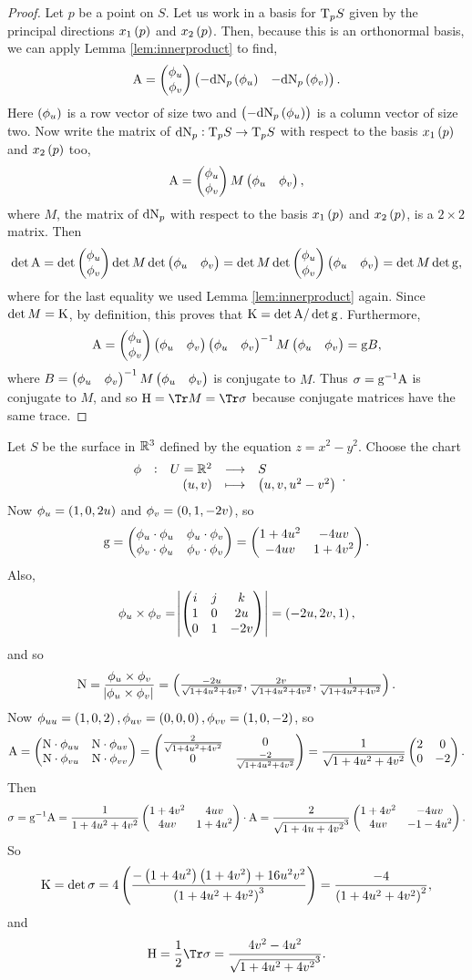 \begin{proof}
Let $ p $ be a point on $ S $. Let us work in a basis for $ \mathrm{T}_p S $ given by the principal directions $ x_1\br{p} $ and $ x_2\br{p} $. Then, because this is an orthonormal basis, we can apply Lemma \ref{lem:innerproduct} to find,
$$ \A = \twobyone{\phi_u}{\phi_v}\onebytwo{-\d\N_p\br{\phi_u}}{-\d\N_p\br{\phi_v}}. $$
Here $ \br{\phi_u} $ is a row vector of size two and $ \br{-\d\N_p\br{\phi_u}} $ is a column vector of size two. Now write the matrix of $ \mathrm{d}\mathrm{N}_p : \mathrm{T}_p S \to \mathrm{T}_p S $ with respect to the basis $ x_1\br{p} $ and $ x_2\br{p} $ too,
$$ \mathrm{A} = \begin{pmatrix} \phi_u \\ \phi_v \end{pmatrix}M\begin{pmatrix} \phi_u & \phi_v \end{pmatrix}, $$
where $ M $, the matrix of $ \mathrm{d}\mathrm{N}_p $ with respect to the basis $ x_1\br{p} $ and $ x_2\br{p} $, is a $ 2 \times 2 $ matrix. Then
$$ \det \mathrm{A} = \det \begin{pmatrix} \phi_u \\ \phi_v \end{pmatrix}\det M\det \begin{pmatrix} \phi_u & \phi_v \end{pmatrix} = \det M\det \begin{pmatrix} \phi_u \\ \phi_v \end{pmatrix}\begin{pmatrix} \phi_u & \phi_v \end{pmatrix} = \det M\det \mathrm{g}, $$
where for the last equality we used Lemma \ref{lem:innerproduct} again. Since $ \det M = \mathrm{K} $, by definition, this proves that $ \mathrm{K} = \det \mathrm{A} / \det \mathrm{g} $. Furthermore,
$$ \mathrm{A} = \begin{pmatrix} \phi_u \\ \phi_v \end{pmatrix}\begin{pmatrix} \phi_u & \phi_v \end{pmatrix}\begin{pmatrix} \phi_u & \phi_v \end{pmatrix}^{-1}M\begin{pmatrix} \phi_u & \phi_v \end{pmatrix} = \mathrm{g} B, $$
where $ B = \begin{pmatrix} \phi_u & \phi_v \end{pmatrix}^{-1}M\begin{pmatrix} \phi_u & \phi_v \end{pmatrix} $ is conjugate to $ M $. Thus $ \sigma = \mathrm{g}^{-1}\mathrm{A} $ is conjugate to $ M $, and so $ \H = \Tr M = \Tr \sigma $ because conjugate matrices have the same trace.
\end{proof}


\begin{example*}
Let $ S $ be the surface in $ \mathbb{R}^3 $ defined by the equation $ z = x^2 - y^2 $. Choose the chart
$$ \function[\phi]{U = \RR^2}{S}{\br{u, v}}{\br{u, v, u^2 - v^2}}. $$
Now $ \phi_u = \br{1, 0, 2u} $ and $ \phi_v = \br{0, 1, -2v} $, so
$$ \mathrm{g} = \begin{pmatrix} \phi_u \cdot \phi_u & \phi_u \cdot \phi_v \\ \phi_v \cdot \phi_u & \phi_v \cdot \phi_v \end{pmatrix} = \begin{pmatrix} 1 + 4u^2 & -4uv \\ -4uv & 1 + 4v^2 \end{pmatrix}. $$
Also,
$$ \phi_u \times \phi_v = \abs{\threebythree{i}{j}{k}{1}{0}{2u}{0}{1}{-2v}} = \br{-2u, 2v, 1}, $$
and so
$$ \N = \dfrac{\phi_u \times \phi_v}{\abs{\phi_u \times \phi_v}} = \br{\tfrac{-2u}{\sqrt{1 + 4u^2 + 4v^2}}, \tfrac{2v}{\sqrt{1 + 4u^2 + 4v^2}}, \tfrac{1}{\sqrt{1 + 4u^2 + 4v^2}}}. $$
Now $ \phi_{uu} = \br{1, 0, 2}, \phi_{uv} = \br{0, 0, 0}, \phi_{vv} = \br{1, 0, -2} $, so
$$ \mathrm{A} = \begin{pmatrix} \mathrm{N} \cdot \phi_{uu} & \mathrm{N} \cdot \phi_{uv} \\ \mathrm{N} \cdot \phi_{vu} & \mathrm{N} \cdot \phi_{vv} \end{pmatrix} = \begin{pmatrix} \tfrac{2}{\sqrt{1 + 4u^2 + 4v^2}} & 0 \\ 0 & \tfrac{-2}{\sqrt{1 + 4u^2 + 4v^2}} \end{pmatrix} = \dfrac{1}{\sqrt{1 + 4u^2 + 4v^2}}\begin{pmatrix} 2 & 0 \\ 0 & -2 \end{pmatrix}. $$
Then
$$ \sigma = \mathrm{g}^{-1}\mathrm{A} = \dfrac{1}{1 + 4u^2 + 4v^2}\begin{pmatrix} 1 + 4v^2 & 4uv \\ 4uv & 1 + 4u^2 \end{pmatrix} \cdot \mathrm{A} = \dfrac{2}{\sqrt{1 + 4u + 4v^2}^3}\begin{pmatrix} 1 + 4v^2 & -4uv \\ 4uv & -1 - 4u^2 \end{pmatrix}. $$
So
$$ \K = \det \sigma = 4\br{\dfrac{-\br{1 + 4u^2}\br{1 + 4v^2} + 16u^2v^2}{\br{1 + 4u^2 + 4v^2}^3}} = \dfrac{-4}{\br{1 + 4u^2 + 4v^2}^2}, $$
and
$$ \H = \dfrac{1}{2}\Tr \sigma = \dfrac{4v^2 - 4u^2}{\sqrt{1 + 4u^2 + 4v^2}^3}. $$
\end{example*}

